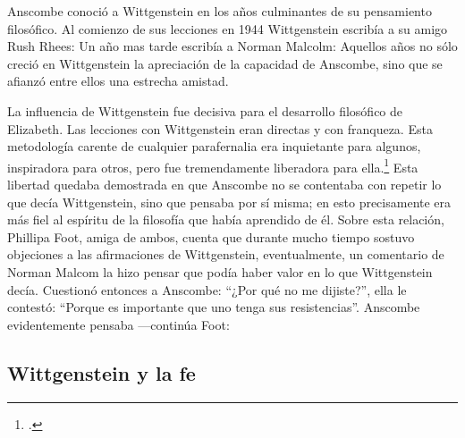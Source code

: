Anscombe conoció a Wittgenstein en los años culminantes de su pensamiento
filosófico. 
Al comienzo de sus lecciones en 1944 Wittgenstein escribía a su amigo Rush Rhees:
Un año mas tarde escribía a Norman Malcolm:
Aquellos años no sólo creció en Wittgenstein la apreciación de la capacidad de
Anscombe, sino que se afianzó entre ellos una estrecha amistad. 

La influencia de Wittgenstein fue decisiva para el desarrollo filosófico de
Elizabeth. Las lecciones con Wittgenstein eran directas y con franqueza. Esta
metodología carente de cualquier parafernalia era inquietante para algunos,
inspiradora para otros, pero fue tremendamente liberadora para
ella.\footcite[loc 9853 Chapter 4, Section 24, \S5]{monk} Esta libertad
quedaba demostrada en que Anscombe no se contentaba con repetir lo que decía
Wittgenstein, sino que pensaba por sí misma; en esto precisamente era más fiel
al espíritu de la filosofía que había aprendido de él. Sobre esta relación,
Phillipa Foot, amiga de ambos, cuenta que durante mucho tiempo sostuvo
objeciones a las afirmaciones de Wittgenstein, eventualmente, un comentario de
Norman Malcom la hizo pensar que podía haber valor en lo que Wittgenstein decía.
Cuestionó entonces a Anscombe: 
``¿Por qué no me dijiste?'', ella le contestó: ``Porque es importante que uno
tenga sus resistencias''. Anscombe evidentemente pensaba ---continúa Foot: 



\subsection{Wittgenstein y la fe}

